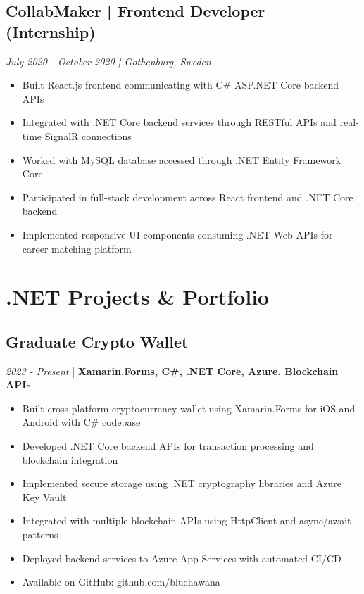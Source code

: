 \documentclass[11pt,a4paper]{article}
\begin{document}
\subsection*{CollabMaker | Frontend Developer (Internship)}
\textit{July 2020 - October 2020 | Gothenburg, Sweden}

\begin{itemize}[leftmargin=*, itemsep=2pt]
\item Built React.js frontend communicating with C\# ASP.NET Core backend APIs
\item Integrated with .NET Core backend services through RESTful APIs and real-time SignalR connections
\item Worked with MySQL database accessed through .NET Entity Framework Core
\item Participated in full-stack development across React frontend and .NET Core backend
\item Implemented responsive UI components consuming .NET Web APIs for career matching platform
\end{itemize}

\section*{.NET Projects \& Portfolio}

\subsection*{Graduate Crypto Wallet}
\textit{2023 - Present} | \textbf{Xamarin.Forms, C\#, .NET Core, Azure, Blockchain APIs}
\begin{itemize}[leftmargin=*, itemsep=1pt]
\item Built cross-platform cryptocurrency wallet using Xamarin.Forms for iOS and Android with C\# codebase
\item Developed .NET Core backend APIs for transaction processing and blockchain integration
\item Implemented secure storage using .NET cryptography libraries and Azure Key Vault
\item Integrated with multiple blockchain APIs using HttpClient and async/await patterns
\item Deployed backend services to Azure App Services with automated CI/CD
\item Available on GitHub: github.com/bluehawana
\end{itemize}
\end{document}

